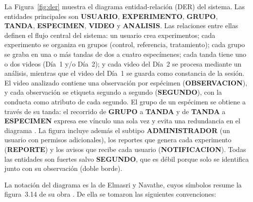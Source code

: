 La Figura~\ref{fig:der} muestra el diagrama entidad-relación (DER) del
sistema. Las entidades principales son \textbf{USUARIO}, \textbf{EXPERIMENTO},
\textbf{GRUPO}, \textbf{TANDA}, \textbf{ESPECIMEN}, \textbf{VIDEO} y
\textbf{ANALISIS}. Las relaciones entre ellas definen el flujo central del
sistema: un usuario crea experimentos; cada experimento se organiza en grupos
(control, referencia, tratamiento); cada grupo se graba en una o más tandas de
dos a cuatro especímenes; cada tanda tiene uno o dos videos (Día~1 y/o Día~2); y
cada video del Día~2 se procesa mediante un análisis, mientras que el video del
Día~1 se guarda como constancia de la sesión. El video analizado contiene una
observación por espécimen (\textbf{OBSERVACION}), y cada observación se etiqueta
segundo a segundo (\textbf{SEGUNDO}), con la conducta como atributo de cada segundo.
El grupo de un espécimen se obtiene a través de su tanda: el recorrido de
\textbf{GRUPO} a \textbf{TANDA} y de \textbf{TANDA} a \textbf{ESPECIMEN} expresa ese
vínculo una sola vez y evita una redundancia en el diagrama
\cite[p.~69]{elmasri2007}. La figura incluye además el subtipo \textbf{ADMINISTRADOR}
(un usuario con permisos adicionales), los reportes que genera cada experimento
(\textbf{REPORTE}) y los avisos que recibe cada usuario (\textbf{NOTIFICACION}).
Todas las entidades son fuertes salvo \textbf{SEGUNDO}, que es débil porque solo se
identifica junto con su observación (doble borde).

La notación del diagrama es la de Elmasri y Navathe, cuyos símbolos resume la
figura~3.14 de su obra \cite[p.~71]{elmasri2007}. De ella se tomaron las siguientes
convenciones:

